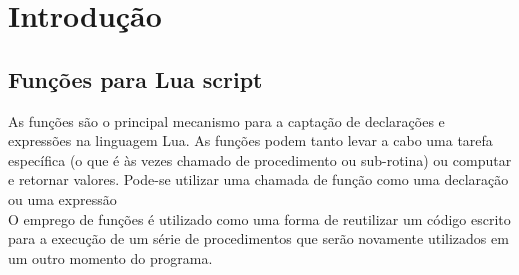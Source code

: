 \section{Introdução}
\label{cap2:introducao}

\subsection{Funções para Lua script}
As funções são o principal mecanismo para a captação de declarações e expressões na linguagem Lua. As funções podem tanto levar a cabo uma tarefa específica (o que é às vezes chamado de procedimento ou sub-rotina) ou computar e retornar valores. Pode-se utilizar uma chamada de função como uma declaração ou uma expressão\\
O emprego de funções é utilizado como uma forma de reutilizar um código escrito para a execução de um série de procedimentos que serão novamente utilizados em um outro momento do programa.\\
